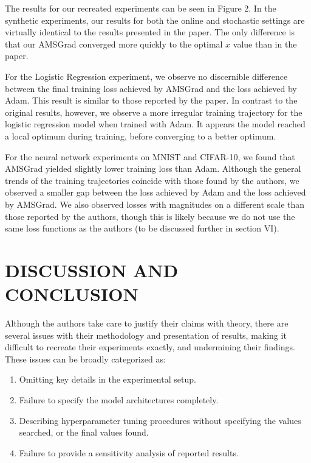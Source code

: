 \documentclass[letterpaper, 10 pt, conference]{ieeeconf}  %
\begin{document}
The results for our recreated experiments can be seen in Figure 2. In the synthetic experiments, our results for both the online and stochastic settings are virtually identical to the results presented in the paper. The only difference is that our AMSGrad converged more quickly to the optimal $x$ value than in the paper.

For the Logistic Regression experiment, we observe no discernible difference between the final training loss achieved by AMSGrad and the loss achieved by Adam. This result is similar to those reported by the paper. In contrast to the original results, however, we observe a more irregular training trajectory for the logistic regression model when trained with Adam. It appears the model reached a local optimum during training, before converging to a better optimum.

For the neural network experiments on MNIST and CIFAR-10, we found that AMSGrad yielded slightly lower training loss than Adam. Although the general trends of the training trajectories coincide with those found by the authors, we observed a smaller gap between the loss achieved by Adam and the loss achieved by AMSGrad. We also observed losses with magnitudes on a different scale than those reported by the authors, though this is likely because we do not use the same loss functions as the authors (to be discussed further in section VI).

\section{DISCUSSION AND CONCLUSION}

Although the authors take care to justify their claims with theory, there are several issues with their methodology and presentation of results, making it difficult to recreate their experiments exactly, and undermining their findings. These issues can be broadly categorized as:

\begin{enumerate}
\item Omitting key details in the experimental setup.
\item Failure to specify the model architectures completely.
\item Describing hyperparameter tuning procedures without specifying the values searched, or the final values found.
\item Failure to provide a sensitivity analysis of reported results.
\end{enumerate}
\end{document}
